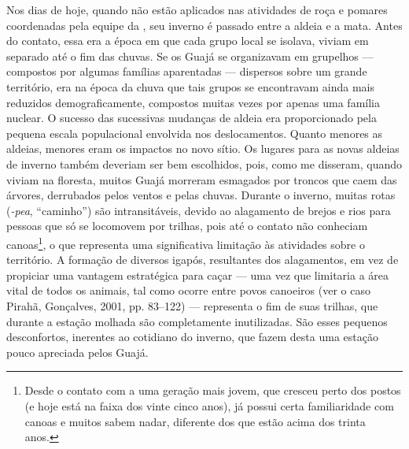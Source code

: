 Nos dias de hoje, quando não estão aplicados nas atividades de roça e
pomares coordenadas pela equipe da , seu inverno é passado entre a
aldeia e a mata. Antes do contato, essa era a época em que cada grupo
local se isolava, viviam em separado até o fim das chuvas. Se os Guajá
se organizavam em grupelhos --- compostos por algumas famílias aparentadas
--- dispersos sobre um grande território, era na época da chuva que tais
grupos se encontravam ainda mais reduzidos demograficamente, compostos
muitas vezes por apenas uma família nuclear. O sucesso das sucessivas
mudanças de aldeia era proporcionado pela pequena escala populacional
envolvida nos deslocamentos. Quanto menores as aldeias, menores eram os
impactos no novo sítio. Os lugares para as novas aldeias de inverno
também deveriam ser bem escolhidos, pois, como me disseram, quando
viviam na floresta, muitos Guajá morreram esmagados por troncos que caem
das árvores, derrubados pelos ventos e pelas chuvas. Durante o inverno,
muitas rotas (\emph{-pea}, ``caminho'') são intransitáveis, devido ao
alagamento de brejos e rios para pessoas que só se locomovem por
trilhas, pois até o contato não conheciam canoas\footnote{Desde o
  contato com a  uma geração mais jovem, que cresceu perto dos
  postos (e hoje está na faixa dos vinte cinco anos), já possui certa
  familiaridade com canoas e muitos sabem nadar, diferente dos que estão
  acima dos trinta anos.}, o que representa uma significativa limitação
às atividades sobre o território. A formação de diversos igapós,
resultantes dos alagamentos, em vez de propiciar uma vantagem
estratégica para caçar --- uma vez que limitaria a área vital de todos os
animais, tal como ocorre entre povos canoeiros (ver o caso Pirahã,
Gonçalves, 2001, pp. 83--122) --- representa o fim de suas trilhas, que
durante a estação molhada são completamente inutilizadas. São esses
pequenos desconfortos, inerentes ao cotidiano do inverno, que fazem
desta uma estação pouco apreciada pelos Guajá.

